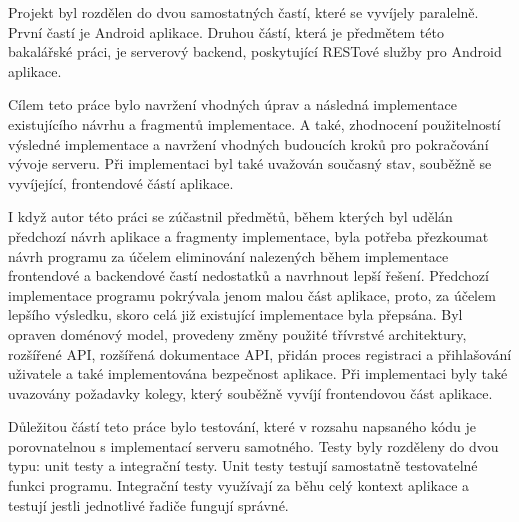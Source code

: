 Projekt byl rozdělen do dvou samostatných častí, které se vyvíjely paralelně. První častí je Android aplikace. Druhou částí, která je předmětem této bakalářské práci, je serverový backend, poskytující RESTové služby pro Android aplikace.

Cílem teto práce bylo navržení vhodných úprav a následná implementace existujícího návrhu a fragmentů implementace. A také, zhodnocení použitelností výsledné implementace a navržení vhodných budoucích kroků pro pokračování vývoje serveru. Při implementaci byl také uvažován současný stav, souběžně se vyvíjející, frontendové částí aplikace.

I když autor této práci se zúčastnil předmětů, během kterých byl udělán předchozí návrh aplikace a fragmenty implementace, byla potřeba přezkoumat návrh programu za účelem eliminování nalezených během implementace frontendové a backendové častí nedostatků a navrhnout lepší řešení. Předchozí implementace programu pokrývala jenom malou část aplikace, proto, za účelem lepšího výsledku, skoro celá již existující implementace byla přepsána. Byl opraven doménový model, provedeny změny použité třívrstvé architektury, rozšířené API, rozšířená dokumentace API, přidán proces registraci a přihlašování uživatele a také implementována bezpečnost aplikace. Při implementaci byly také uvazovány požadavky kolegy, který souběžně vyvíjí frontendovou část aplikace.

Důležitou částí teto práce bylo testování, které v rozsahu napsaného kódu je porovnatelnou s implementací serveru samotného. Testy byly rozděleny do dvou typu: unit testy a integrační testy. Unit testy testují samostatně testovatelné funkci programu. Integrační testy využívají za běhu celý kontext aplikace a testují jestli jednotlivé řadiče fungují správné. 

